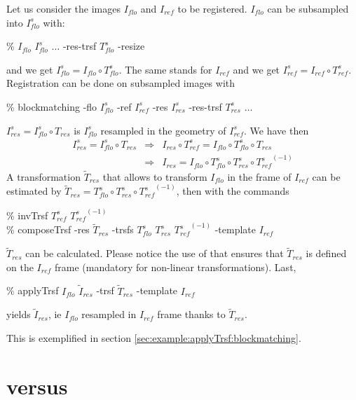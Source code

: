 Let us consider the images $I_{flo}$ and $I_{ref}$ to be registered. $I_{flo}$ can be subsampled into $I^s_{flo}$ with:
\begin{code}{0.8}
\% \applyTrsf $I_{flo}$ $I^s_{flo}$ $\ldots$ -res-trsf $T^s_{flo}$ -resize
\end{code}
and we get $I^s_{flo} = I_{flo} \circ T^s_{flo}$. The same stands for $I_{ref}$ and we get $I^s_{ref} = I_{ref} \circ T^s_{ref}$. Registration can be done on subsampled images with
\begin{code}{0.8}
\% blockmatching -flo $I^s_{flo}$ -ref $I^s_{ref}$ -res $I^s_{res}$ -res-trsf $T^s_{res}$ $\ldots$
\end{code}
$I^s_{res} = I^s_{flo} \circ T_{res}$ is $I^s_{flo}$ resampled in the geometry of $I^s_{ref}$. We have then
\begin{eqnarray*}
I^s_{res} = I^s_{flo} \circ T_{res}
& \Rightarrow &
I_{res} \circ T^s_{ref} = I_{flo} \circ T^s_{flo} \circ T_{res} \\
& \Rightarrow &
I_{res} = I_{flo} \circ T^s_{flo} \circ T^s_{res} \circ {T^s_{ref}}^{(-1)}
\end{eqnarray*}
A transformation $\tilde{T}_{res}$ that allows to transform $I_{flo}$ in the frame of $I_{ref}$ can be estimated by
$\tilde{T}_{res} = T^s_{flo} \circ T^s_{res} \circ {T^s_{ref}}^{(-1)}$, then with the commands
\begin{code}{0.8}
\% invTrsf  $T^s_{ref}$ ${T^s_{ref}}^{(-1)}$ \\
\% composeTrsf -res $\tilde{T}_{res}$ -trsfs $T^s_{flo}$ $T^s_{res}$ ${T^s_{ref}}^{(-1)}$ -template $I_{ref}$
\end{code}
$\tilde{T}_{res}$ can be calculated. Please notice the use of  that ensures that  $\tilde{T}_{res}$  is defined on the $I_{ref}$ frame (mandatory for non-linear transformations).
Last, 
\begin{code}{0.8}
\% applyTrsf $I_{flo}$ $\tilde{I}_{res}$ -trsf  $\tilde{T}_{res}$ -template $I_{ref}$
\end{code}
yields $\tilde{I}_{res}$, ie $I_{flo}$ resampled in $I_{ref}$ frame thanks to $\tilde{T}_{res}$.

This is exemplified in section \ref{sec:example:applyTrsf:blockmatching}.



\section{\blockmatching versus \baladin}

